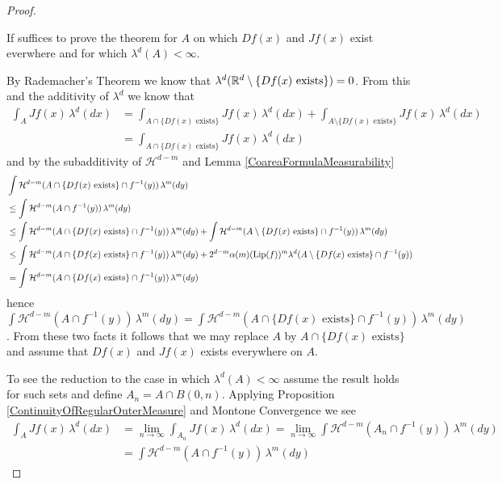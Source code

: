 \begin{proof}
\begin{clm}If suffices to prove the theorem for $A$ on which $Df(x)$ and $Jf(x)$ exist everwhere and for which $\lambda^d(A) < \infty$.
\end{clm}
By Rademacher's Theorem we know that $\lambda^d(\mathbb{R}^d \setminus \lbrace Df(x) \text{ exists} \rbrace) =0$.  From this and the additivity of $\lambda^d$ we know that
\begin{align*}
\int_A Jf(x) \, \lambda^d(dx) &= \int_{A \cap \lbrace Df(x) \text{ exists} \rbrace}  Jf(x) \, \lambda^d(dx) + \int_{A \setminus \lbrace Df(x) \text{ exists} \rbrace}  Jf(x) \, \lambda^d(dx) \\
&= \int_{A \cap \lbrace Df(x) \text{ exists} \rbrace}  Jf(x) \, \lambda^d(dx) 
\end{align*}
and by the subadditivity of $\mathcal{H}^{d-m}$ and Lemma \ref{CoareaFormulaMeasurability}
\begin{align*}
&\int \mathcal{H}^{d-m}(A \cap \lbrace Df(x) \text{ exists} \rbrace \cap  f^{-1}(y)) \, \lambda^m(dy) \\
&\leq \int \mathcal{H}^{d-m}(A \cap f^{-1}(y)) \, \lambda^m(dy) \\
&\leq \int \mathcal{H}^{d-m}(A \cap \lbrace Df(x) \text{ exists} \rbrace \cap f^{-1}(y)) \, \lambda^m(dy) 
+ \int \mathcal{H}^{d-m}(A \setminus \lbrace Df(x) \text{ exists} \rbrace \cap f^{-1}(y)) \, \lambda^m(dy) \\
&\leq \int \mathcal{H}^{d-m}(A \cap \lbrace Df(x) \text{ exists} \rbrace \cap f^{-1}(y)) \, \lambda^m(dy)  + 
2^{d-m} \alpha(m) (\operatorname*{Lip}(f))^m \lambda^d(A \setminus \lbrace Df(x) \text{ exists} \rbrace \cap f^{-1}(y)) \\
&=\int \mathcal{H}^{d-m}(A \cap \lbrace Df(x) \text{ exists} \rbrace \cap f^{-1}(y)) \, \lambda^m(dy)
\end{align*}
hence $\int \mathcal{H}^{d-m}(A \cap f^{-1}(y)) \, \lambda^m(dy)  = \int \mathcal{H}^{d-m}(A \cap \lbrace Df(x) \text{ exists} \rbrace \cap f^{-1}(y)) \, \lambda^m(dy)$.
From these two facts it follows that we may replace $A$ by $A \cap \lbrace Df(x) \text{ exists} \rbrace$ and assume that $Df(x)$ and $Jf(x)$ exists everywhere on $A$.

To see the reduction to the case in which $\lambda^d(A) < \infty$ assume the result holds for such sets and define $A_n = A \cap B(0,n)$.  Applying Proposition \ref{ContinuityOfRegularOuterMeasure} and 
Montone Convergence we see
\begin{align*}
\int_A Jf(x) \, \lambda^d(dx) 
&= \lim_{n \to \infty}\int_{A_n} Jf(x) \, \lambda^d(dx) 
= \lim_{n \to \infty} \int \mathcal{H}^{d-m}(A_n \cap f^{-1}(y)) \, \lambda^m(dy) \\
&= \int \mathcal{H}^{d-m}(A \cap f^{-1}(y)) \, \lambda^m(dy)
\end{align*}


\end{proof}
